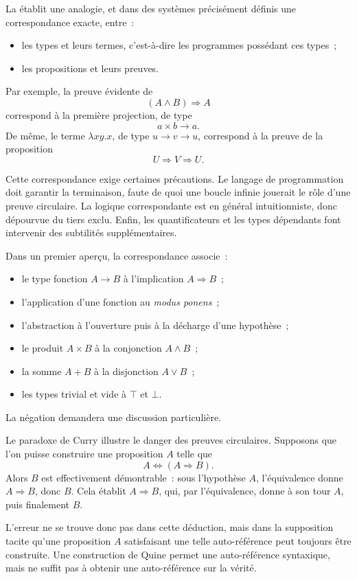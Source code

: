 \thingy La  établit une analogie,
et dans des systèmes précisément définis une correspondance exacte,
entre :
\begin{itemize}
\item les types et leurs termes, c'est-à-dire les programmes possédant
  ces types ;
\item les propositions et leurs preuves.
\end{itemize}
Par exemple, la preuve évidente de
\[
(A\land B)\Rightarrow A
\]
correspond à la première projection, de type
\[
a\times b\rightarrow a.
\]
De même, le terme $\lambda xy.x$, de type $u\to v\to u$, correspond à
la preuve de la proposition
\[
U\Rightarrow V\Rightarrow U.
\]

Cette correspondance exige certaines précautions. Le langage de
programmation doit garantir la terminaison, faute de quoi une boucle
infinie jouerait le rôle d'une preuve circulaire. La logique
correspondante est en général intuitionniste, donc dépourvue du tiers
exclu. Enfin, les quantificateurs et les types dépendants font
intervenir des subtilités supplémentaires.

Dans un premier aperçu, la correspondance associe :
\begin{itemize}
\item le type fonction $A\to B$ à l'implication $A\Rightarrow B$ ;
\item l'application d'une fonction au \textit{modus ponens} ;
\item l'abstraction à l'ouverture puis à la décharge d'une hypothèse ;
\item le produit $A\times B$ à la conjonction $A\land B$ ;
\item la somme $A+B$ à la disjonction $A\lor B$ ;
\item les types trivial et vide à $\top$ et $\bot$.
\end{itemize}
La négation demandera une discussion particulière.

\thingy Le paradoxe de Curry illustre le danger des preuves
circulaires. Supposons que l'on puisse construire une proposition $A$
telle que
\[
A\Leftrightarrow(A\Rightarrow B).
\]
Alors $B$ est effectivement démontrable : sous l'hypothèse $A$,
l'équivalence donne $A\Rightarrow B$, donc $B$. Cela établit
$A\Rightarrow B$, qui, par l'équivalence, donne à son tour $A$, puis
finalement $B$.

L'erreur ne se trouve donc pas dans cette déduction, mais dans la
supposition tacite qu'une proposition $A$ satisfaisant une telle
auto-référence peut toujours être construite. Une construction de
Quine permet une auto-référence syntaxique, mais ne suffit pas à
obtenir une auto-référence sur la vérité.

